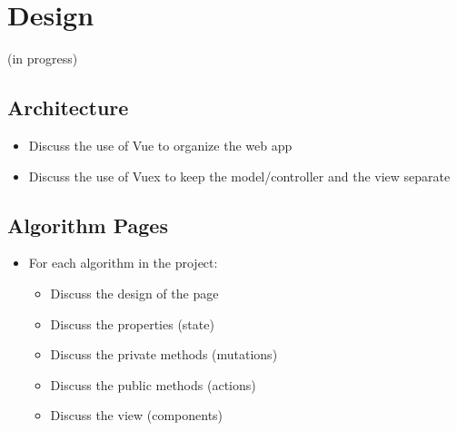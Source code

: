 \chapter{Design}
(in progress)
\section{Architecture}
\begin{itemize}
	\item Discuss the use of Vue to organize the web app 
	\item Discuss the use of Vuex to keep the model/controller and the view separate
\end{itemize}
\section{Algorithm Pages}
\begin{itemize}
	\item For each algorithm in the project:
	\begin{itemize}
		\item Discuss the design of the page
		\item Discuss the properties (state)
		\item Discuss the private methods (mutations)
		\item Discuss the public methods (actions)
		\item Discuss the view (components)
	\end{itemize}
\end{itemize}
